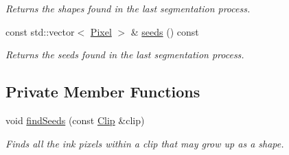 \begin{CompactItemize}
\begin{CompactList}\small\item\em Returns the shapes found in the last segmentation process. \item\end{CompactList}\item 
const std::vector$<$ \hyperlink{_pixel_8hpp_535e59456e3e633842529cfa8ea103c4}{Pixel} $>$ \& \hyperlink{class_segmenter_100bffdc0fe9834d81ddc63661b4c1ec}{seeds} () const 
\begin{CompactList}\small\item\em Returns the seeds found in the last segmentation process. \item\end{CompactList}\end{CompactItemize}
\subsection*{Private Member Functions}
\begin{CompactItemize}
\item 
void \hyperlink{class_segmenter_bacab187b543a51c5322c01fc0a29ffb}{findSeeds} (const \hyperlink{class_clip}{Clip} \&clip)
\begin{CompactList}\small\item\em Finds all the ink pixels within a clip that may grow up as a shape. \item\end{CompactList}\end{CompactItemize}
